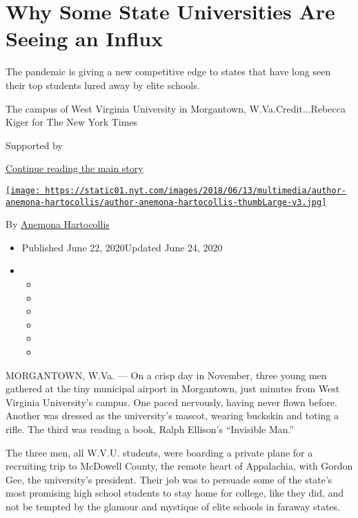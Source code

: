\hypertarget{why-some-state-universities-are-seeing-an-influx}{%
\section{Why Some State Universities Are Seeing an
Influx}\label{why-some-state-universities-are-seeing-an-influx}}

The pandemic is giving a new competitive edge to states that have long
seen their top students lured away by elite schools.

The campus of West Virginia University in Morgantown,
W.Va.Credit...Rebecca Kiger for The New York Times

Supported by

\protect\hyperlink{after-sponsor}{Continue reading the main story}

\href{https://www.nytimes.com/by/anemona-hartocollis}{\texttt{[image: https://static01.nyt.com/images/2018/06/13/multimedia/author-anemona-hartocollis/author-anemona-hartocollis-thumbLarge-v3.jpg]}}

By \href{https://www.nytimes.com/by/anemona-hartocollis}{Anemona
Hartocollis}

\begin{itemize}
\item
  Published June 22, 2020Updated June 24, 2020
\item
  \begin{itemize}
  \item
  \item
  \item
  \item
  \item
  \item
  \end{itemize}
\end{itemize}

MORGANTOWN, W.Va. --- On a crisp day in November, three young men
gathered at the tiny municipal airport in Morgantown, just minutes from
West Virginia University's campus. One paced nervously, having never
flown before. Another was dressed as the university's mascot, wearing
buckskin and toting a rifle. The third was reading a book, Ralph
Ellison's ``Invisible Man.''

The three men, all W.V.U. students, were boarding a private plane for a
recruiting trip to McDowell County, the remote heart of Appalachia, with
Gordon Gee, the university's president. Their job was to persuade some
of the state's most promising high school students to stay home for
college, like they did, and not be tempted by the glamour and mystique
of elite schools in faraway states.

